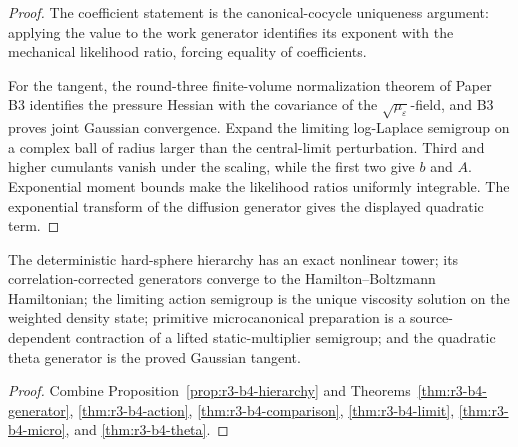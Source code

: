 \begin{proof}
The coefficient statement is the canonical-cocycle uniqueness argument:
applying the value to the work generator identifies its exponent with the
mechanical likelihood ratio, forcing equality of coefficients.

For the tangent, the round-three finite-volume normalization theorem of Paper B3 identifies
the pressure Hessian with the covariance of the
\(\sqrt{\mu_\varepsilon}\)-field, and B3 proves joint Gaussian convergence.
Expand the limiting log-Laplace semigroup on a complex ball of radius larger
than the central-limit perturbation.  Third and higher cumulants vanish under
the scaling, while the first two give \(b\) and \(A\).  Exponential moment
bounds make the likelihood ratios uniformly integrable.  The exponential
transform of the diffusion generator gives the displayed quadratic term.
\end{proof}

\begin{theorem}
\label{thm:r3-b4-main}
The deterministic hard-sphere hierarchy has an exact nonlinear tower; its
correlation-corrected generators converge to the Hamilton--Boltzmann
Hamiltonian; the limiting action semigroup is the unique viscosity solution
on the weighted density state; primitive microcanonical preparation is a
source-dependent contraction of a lifted static-multiplier semigroup; and the
quadratic theta generator is the proved Gaussian tangent.
\end{theorem}

\begin{proof}
Combine Proposition~\ref{prop:r3-b4-hierarchy} and
Theorems~\ref{thm:r3-b4-generator}, \ref{thm:r3-b4-action},
\ref{thm:r3-b4-comparison}, \ref{thm:r3-b4-limit},
\ref{thm:r3-b4-micro}, and \ref{thm:r3-b4-theta}.
\end{proof}
